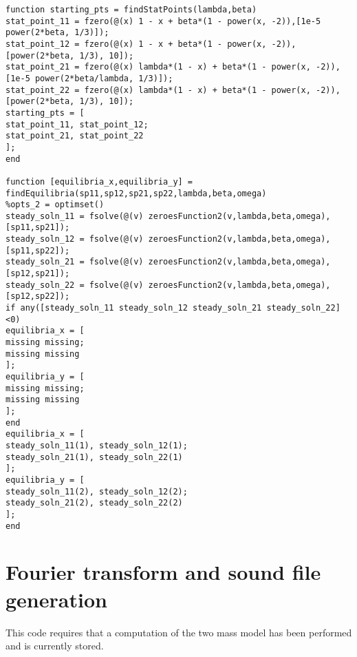 \documentclass{report}
\begin{document}
\begin{verbatim}
function starting_pts = findStatPoints(lambda,beta)
stat_point_11 = fzero(@(x) 1 - x + beta*(1 - power(x, -2)),[1e-5 power(2*beta, 1/3)]);
stat_point_12 = fzero(@(x) 1 - x + beta*(1 - power(x, -2)),[power(2*beta, 1/3), 10]);
stat_point_21 = fzero(@(x) lambda*(1 - x) + beta*(1 - power(x, -2)),[1e-5 power(2*beta/lambda, 1/3)]); 
stat_point_22 = fzero(@(x) lambda*(1 - x) + beta*(1 - power(x, -2)),[power(2*beta, 1/3), 10]);
starting_pts = [
stat_point_11, stat_point_12;
stat_point_21, stat_point_22
];
end

function [equilibria_x,equilibria_y] = findEquilibria(sp11,sp12,sp21,sp22,lambda,beta,omega)
%opts_2 = optimset()
steady_soln_11 = fsolve(@(v) zeroesFunction2(v,lambda,beta,omega),[sp11,sp21]);
steady_soln_12 = fsolve(@(v) zeroesFunction2(v,lambda,beta,omega),[sp11,sp22]);
steady_soln_21 = fsolve(@(v) zeroesFunction2(v,lambda,beta,omega),[sp12,sp21]);
steady_soln_22 = fsolve(@(v) zeroesFunction2(v,lambda,beta,omega),[sp12,sp22]);
if any([steady_soln_11 steady_soln_12 steady_soln_21 steady_soln_22]<0)
equilibria_x = [
missing missing;
missing missing
];
equilibria_y = [
missing missing;
missing missing
];
end
equilibria_x = [
steady_soln_11(1), steady_soln_12(1);
steady_soln_21(1), steady_soln_22(1)
];
equilibria_y = [
steady_soln_11(2), steady_soln_12(2);
steady_soln_21(2), steady_soln_22(2)
];
end
\end{verbatim}

\section{Fourier transform and sound file generation}

This code requires that a computation of the two mass model has been performed and is currently stored.
\end{document}
